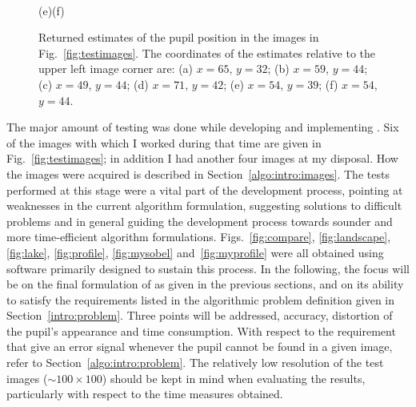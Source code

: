 \begin{figure}[tb]
  \paragraph{}
  \hspace*{0.28\textwidth}(e)\hspace*{0.38\textwidth}(f)
  \caption{\label{fig:results}Returned estimates of the pupil position
    in the images in Fig.~\protect\ref{fig:testimages}.  The
    coordinates of the estimates relative to the upper left image
    corner are: (a) $x=65$, $y=32$; (b) $x=59$, $y=44$; (c) $x=49$,
    $y=44$; (d) $x=71$, $y=42$; (e) $x=54$, $y=39$; (f) $x=54$,
    $y=44$.}
\end{figure}

The major amount of testing was done while developing and implementing
{\octopus}.  Six of the images with which I worked during that time
are given in Fig.~\ref{fig:testimages}; in addition I had another four
images at my disposal.  How the images were acquired is described in
Section~\ref{algo:intro:images}.  The tests performed at this stage
were a vital part of the development process, pointing at weaknesses
in the current algorithm formulation, suggesting solutions to
difficult problems and in general guiding the development process
towards sounder and more time-efficient algorithm formulations.
Figs.~\ref{fig:compare}, \ref{fig:landscape}, \ref{fig:lake},
\ref{fig:profile}, \ref{fig:mysobel} and~\ref{fig:myprofile} were all
obtained using software primarily designed to sustain this process.
In the following, the focus will be on the final formulation of
{\octopus} as given in the previous sections, and on its ability to
satisfy the requirements listed in the algorithmic problem definition
given in Section~\ref{intro:problem}.  Three points will be addressed,
accuracy, distortion of the pupil's appearance and time consumption.
With respect to the requirement that {\octopus} give an error signal
whenever the pupil cannot be found in a given image, refer to
Section~\ref{algo:intro:problem}.  The relatively low resolution of
the test images ($\sim 100\times 100$) should be kept in mind when
evaluating the results, particularly with respect to the time measures
obtained.

